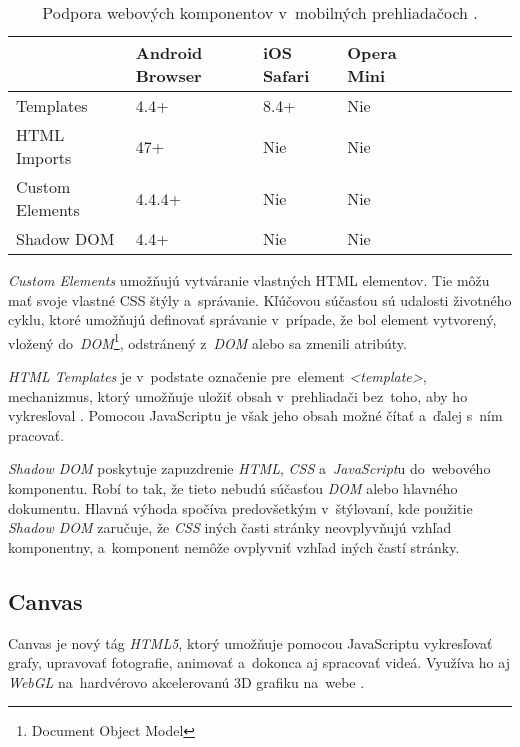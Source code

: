 \begin{table}[]
\centering
\begin{tabular}{@{}|l|l|l|l|l|l|l|l|l|@{}}
\toprule
                & Android Browser & iOS Safari & Opera Mini \\ \midrule
Templates       & 4.4+            & 8.4+       & Nie        \\ \midrule
HTML Imports    & 47+             & Nie        & Nie        \\ \midrule
Custom Elements & 4.4.4+          & Nie        & Nie        \\ \midrule
Shadow DOM      & 4.4+            & Nie        & Nie        \\ \bottomrule
\end{tabular}
\caption{Podpora webových komponentov v~mobilných prehliadačoch \cite{MDN_Template_Element}. \cite{CIU}}
\label{tab:webcomponents-support-mobile}
\end{table}


\emph{Custom Elements} umožňujú vytváranie vlastných HTML elementov. Tie môžu mať svoje vlastné CSS štýly a~správanie. Kľúčovou súčasťou sú udalosti životného cyklu, ktoré umožňujú definovať správanie v~prípade, že bol element vytvorený, vložený do~\emph{DOM}\footnote{Document Object Model}, odstránený z~\emph{DOM} alebo sa zmenili atribúty. \cite{MDN_WebComponents}

\emph{HTML Templates} je v~podstate označenie pre~element \emph{<template>}, mechanizmus, ktorý umožňuje uložiť obsah v~prehliadači bez~toho, aby ho vykresľoval \cite{MDN_Template_Element}. Pomocou JavaScriptu je však jeho obsah možné čítať a~ďalej s~ním pracovať. 

\emph{Shadow DOM} poskytuje zapuzdrenie \emph{HTML}, \emph{CSS} a~\emph{JavaScript}u do~webového komponentu. Robí to tak, že tieto nebudú súčasťou \emph{DOM} alebo hlavného dokumentu. Hlavná výhoda spočíva predovšetkým v~štýlovaní, kde použitie \emph{Shadow DOM} zaručuje, že \emph{CSS} iných časti stránky neovplyvňujú vzhľad komponentny, a~komponent nemôže ovplyvniť vzhľad iných častí stránky. \cite{MDN_Shadow_DOM}


\subsection{Canvas}
\label{sec:canvas-element}

Canvas je nový tág \emph{HTML5}, ktorý umožňuje pomocou JavaScriptu vykresľovať grafy, upravovať fotografie, animovať a~dokonca aj spracovať videá. Využíva ho aj \emph{WebGL} na~hardvérovo akcelerovanú 3D grafiku na~webe \cite{MDN_Canvas}.

